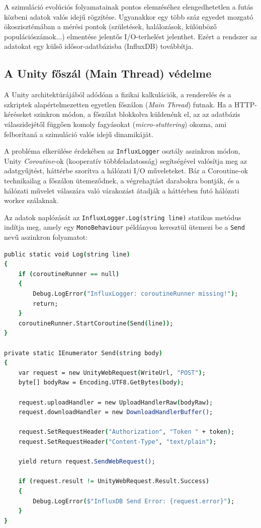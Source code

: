 A szimuláció evolúciós folyamatainak pontos elemzéséhez elengedhetetlen a futás közbeni adatok valós idejű rögzítése. Ugyanakkor egy több száz egyedet mozgató ökoszisztémában a mérési pontok (születések, halálozások, különböző populációszámok...) elmentése jelentős I/O-terhelést jelenthet. Ezért a rendszer az adatokat egy külső idősor-adatbázisba (InfluxDB) továbbítja.

\subsection{A Unity főszál (Main Thread) védelme}

A Unity architektúrájából adódóan a fizikai kalkulációk, a renderelés és a szkriptek alapértelmezetten egyetlen főszálon (\textit{Main Thread}) futnak. Ha a HTTP-kéréseket szinkron módon, a főszálat blokkolva küldenénk el, az az adatbázis válaszidejétől függően komoly fagyásokat (\textit{micro-stuttering}) okozna, ami felborítaná a szimuláció valós idejű dinamikáját.

A probléma elkerülése érdekében az \texttt{InfluxLogger} osztály aszinkron módon, Unity \textit{Coroutine}-ok (kooperatív többfeladatosság) segítségével valósítja meg az adatgyűjtést, háttérbe szorítva a hálózati I/O műveleteket. Bár a Coroutine-ok technikailag a főszálon ütemeződnek, a végrehajtást darabokra bontják, és a hálózati művelet válaszára való várakozást átadják a háttérben futó hálózati worker szálaknak.

Az adatok naplózását az \texttt{InfluxLogger.Log(string line)} statikus metódus indítja meg, amely egy \texttt{MonoBehaviour} példányon keresztül ütemezi be a \texttt{Send} nevű aszinkron folyamatot:

\begin{lstlisting}[language=csh, caption={Aszinkron adatküldés megvalósítása Coroutine segítségével}]
public static void Log(string line)
{
    if (coroutineRunner == null)
    {
        Debug.LogError("InfluxLogger: coroutineRunner missing!");
        return;
    }
    coroutineRunner.StartCoroutine(Send(line));
}

private static IEnumerator Send(string body)
{
    var request = new UnityWebRequest(WriteUrl, "POST");
    byte[] bodyRaw = Encoding.UTF8.GetBytes(body);

    request.uploadHandler = new UploadHandlerRaw(bodyRaw);
    request.downloadHandler = new DownloadHandlerBuffer();

    request.SetRequestHeader("Authorization", "Token " + token);
    request.SetRequestHeader("Content-Type", "text/plain");

    yield return request.SendWebRequest();

    if (request.result != UnityWebRequest.Result.Success)
    {
        Debug.LogError($"InfluxDB Send Error: {request.error}");
    }
}
\end{lstlisting}


